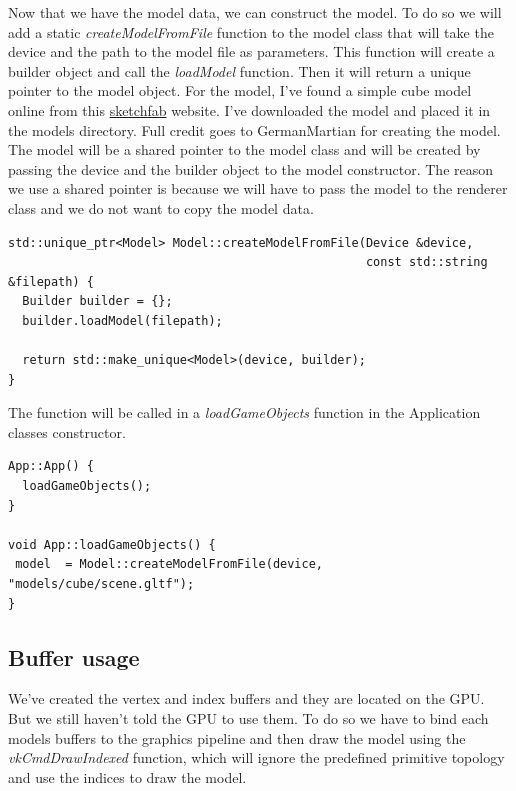 \documentclass[12pt]{report} \usepackage{preamble}
\begin{document}
Now that we have the model data, we can construct the model. To do so we will add a static \textit{createModelFromFile} function to the model class that will take the device and the path to the model file as parameters.
This function will create a builder object and call the \textit{loadModel} function. Then it will return a unique pointer to the model object.
For the model, I've found a simple cube model online from this \href{https://sketchfab.com/3d-models/epic-simple-cube-3a180582490b4395bc6384ea2bb740aa}{sketchfab} website.
I've downloaded the model and placed it in the models directory. Full credit goes to German\textunderscore Martian \cite{German_Martian} for creating the model.
The model will be a shared pointer to the model class and will be created by passing the device and the builder object to the model constructor.
The reason we use a shared pointer is because we will have to pass the model to the renderer class and we do not want to copy the model data.

\begin{lstlisting}[Language=C++]
std::unique_ptr<Model> Model::createModelFromFile(Device &device,
                                                  const std::string &filepath) {
  Builder builder = {};
  builder.loadModel(filepath);

  return std::make_unique<Model>(device, builder);
}
\end{lstlisting}

The  function will be called in a \textit{loadGameObjects} function in the Application classes constructor.

\begin{lstlisting}[Language=C++]
App::App() {
  loadGameObjects();
}

void App::loadGameObjects() {
 model  = Model::createModelFromFile(device, "models/cube/scene.gltf");
}
\end{lstlisting}

\subsection{Buffer usage}

We've created the vertex and index buffers and they are located on the GPU. But we still haven't told the GPU to use them.
To do so we have to bind each models buffers to the graphics pipeline and then draw the model using the \textit{vkCmdDrawIndexed} function,
which will ignore the predefined primitive topology and use the indices to draw the model.
\end{document}
